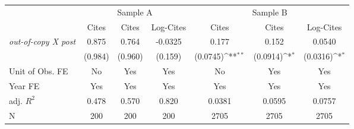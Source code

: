 {
\def\sym#1{\ifmmode^{#1}\else\(^{#1}\)\fi}
\begin{tabular*}{\hsize}{@{\hskip\tabcolsep\extracolsep\fill}l*{6}{c}}
\toprule
            &\multicolumn{3}{c}{Sample A}                                     &\multicolumn{3}{c}{Sample B}                                     \\\cmidrule(lr){2-4}\cmidrule(lr){5-7}
            &\multicolumn{1}{c}{Cites}&\multicolumn{1}{c}{Cites}&\multicolumn{1}{c}{Log-Cites}&\multicolumn{1}{c}{Cites}&\multicolumn{1}{c}{Cites}&\multicolumn{1}{c}{Log-Cites}\\
\midrule
\emph{out-of-copy X post}&       0.875         &       0.764         &     -0.0325         &       0.177         &       0.152         &      0.0540         \\
            &     (0.984)         &     (0.960)         &     (0.159)         &    (0.0745)\sym{**} &    (0.0914)\sym{*}  &    (0.0316)\sym{*}  \\
\midrule
Unit of Obs. FE&          No         &         Yes         &         Yes         &          No         &         Yes         &         Yes         \\
Year FE     &         Yes         &         Yes         &         Yes         &         Yes         &         Yes         &         Yes         \\
adj. $R^2$  &       0.478         &       0.570         &       0.820         &      0.0381         &      0.0595         &      0.0757         \\
N           &         200         &         200         &         200         &        2705         &        2705         &        2705         \\
\bottomrule
\end{tabular*}
}
